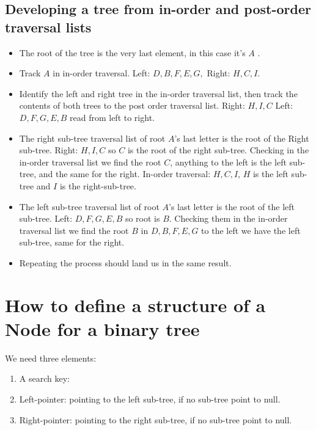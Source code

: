 \subsection{Developing a tree from in-order and post-order traversal lists}
\begin{itemize}
    \item The root of the tree is the very last element, in this case it's $A$ .
    \item Track $A$ in in-order traversal. Left: $D,B,F,E,G,$ Right: $H,C,I$.
    \item Identify the left and right tree in the in-order traversal list, then track the contents of both trees to the post order traversal list. Right: $H,I,C$ Left: $D,F,G,E,B$ read from left to right.
    \item The right sub-tree traversal list of root $A$'s  last letter is the root of the Right sub-tree. Right: $H,I,C$ so $C$ is the root of the right sub-tree. Checking in the in-order traversal list we find the root $C$, anything to the left is the left sub-tree, and the same for the right. In-order traversal: $H,C,I$, $H$ is the left sub-tree and $I$ is the right-sub-tree. 
    \item The left sub-tree traversal list of root $A$'s last letter is the root of the left sub-tree. Left: $D,F,G,E,B$ so root is $B$. Checking them in the in-order traversal list we find the root $B$ in $D,B,F,E,G$ to the left we have the left sub-tree, same for the right. 
    \item Repeating the process should land us in the same result. 
\end{itemize}

\section{How to define a structure of a Node for a binary tree}
We need three elements:
\begin{enumerate}
    \item A search key: 
    \item Left-pointer: pointing to the left sub-tree, if no sub-tree point to null. 
    \item Right-pointer: pointing to the right sub-tree, if no sub-tree point to null.
\end{enumerate}


